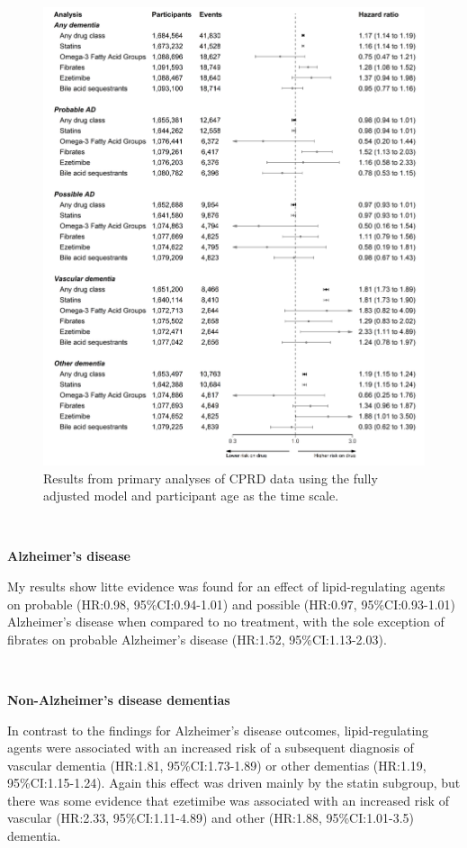 \documentclass[a4paper, twoside]{templates/ociamthesis}
\begin{document}
\begin{figure}[H]
\includegraphics[width=1\linewidth]{figures/cprd-analysis/forester_p1} \caption[Results from primary analyses of CPRD data]{Results from primary analyses of CPRD data using the fully adjusted model and participant age as the time scale.}\label{fig:cprdPrimary}
\end{figure}

~

\textbf{Alzheimer's disease}

My results show litte evidence was found for an effect of lipid-regulating agents on probable (HR:0.98, 95\%CI:0.94-1.01) and possible (HR:0.97, 95\%CI:0.93-1.01) Alzheimer's disease when compared to no treatment, with the sole exception of fibrates on probable Alzheimer's disease (HR:1.52, 95\%CI:1.13-2.03).

~

\textbf{Non-Alzheimer's disease dementias}

In contrast to the findings for Alzheimer's disease outcomes, lipid-regulating agents were associated with an increased risk of a subsequent diagnosis of vascular dementia (HR:1.81, 95\%CI:1.73-1.89) or other dementias (HR:1.19, 95\%CI:1.15-1.24). Again this effect was driven mainly by the statin subgroup, but there was some evidence that ezetimibe was associated with an increased risk of vascular (HR:2.33, 95\%CI:1.11-4.89) and other (HR:1.88, 95\%CI:1.01-3.5) dementia.
\end{document}
